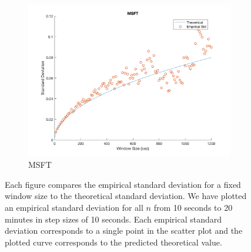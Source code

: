 \begin{figure}[htbp]
\vspace{3mm}

\begin{subfigure}[t]{0.49\textwidth}
\captionsetup{labelformat=empty}

\caption{MSFT}
\includegraphics[width=\textwidth, trim = 0 0 0 30, clip]{CHPDO_Fit/MSFT_Plot_CHPDO_21600.png}
\end{subfigure}

\caption{\label{fig:chpdofit} Each figure compares the empirical standard deviation for a fixed window size to the theoretical standard deviation. We have plotted an empirical standard deviation for all $n$ from 10 seconds to 20 minutes in step sizes of 10 seconds. Each empirical standard deviation corresponds to a single point in the scatter plot and the plotted curve corresponds to the predicted theoretical value.}


\end{figure}